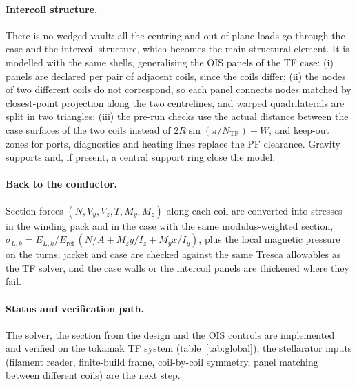 \paragraph{Intercoil structure.} There is no wedged vault: all the
centring and out-of-plane loads go through the case and the intercoil
structure, which becomes the main structural element. It is modelled with
the same shells, generalising the OIS panels of the TF case: (i) panels
are declared per pair of adjacent coils, since the coils differ; (ii) the
nodes of two different coils do not correspond, so each panel connects
nodes matched by closest-point projection along the two centrelines, and
warped quadrilaterals are split in two triangles; (iii) the pre-run checks
use the actual distance between the case surfaces of the two coils
instead of $2R\sin(\pi/N_\mathrm{TF})-W$, and keep-out zones for ports,
diagnostics and heating lines replace the PF clearance. Gravity supports
and, if present, a central support ring close the model.

\paragraph{Back to the conductor.} Section forces $(N,V_y,V_z,T,M_y,M_z)$
along each coil are converted into stresses in the winding pack and in
the case with the same modulus-weighted section, $\sigma_{L,k}=E_{L,k}/E_\mathrm{ref}\,
(N/A + M_z y/I_z + M_y x/I_y)$, plus the local magnetic pressure on the
turns; jacket and case are checked against the same Tresca allowables as
the TF solver, and the case walls or the intercoil panels are thickened
where they fail.

\paragraph{Status and verification path.} The solver, the section from
the design and the OIS controls are implemented and verified on the
tokamak TF system (table~\ref{tab:global}); the stellarator inputs
(filament reader, finite-build frame, coil-by-coil symmetry, panel
matching between different coils) are the next step.

